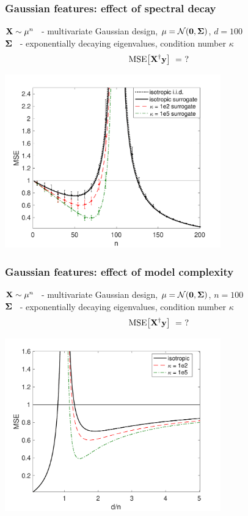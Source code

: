 \documentclass{beamer}
\begin{document}
\begin{frame}
  \frametitle{Gaussian features: effect of spectral decay}
  $\mathbf X\sim\mu^n$ \ - multivariate Gaussian design,
  $\mu=\mathcal{N}(\mathbf 0,\mathbf{\Sigma})$, $d=100$\\
$\mathbf{\Sigma}$ \ - exponentially decaying eigenvalues, condition
number $\kappa$
\pause
\begin{align*}
{\mathrm{MSE}\big[\mathbf X^\dagger\mathbf y\big]}\ =\ ?
  \end{align*}
  \pause \vspace{-3mm}
  \begin{center}
    \includegraphics[width=0.7\textwidth]{../figs/descent-full}
  \end{center}
\end{frame}

\begin{frame}
  \frametitle{Gaussian features: effect of model complexity}
    $\mathbf X\sim\mu^n$ \ - multivariate Gaussian design,
  $\mu=\mathcal{N}(\mathbf 0,\mathbf{\Sigma})$, $n=100$\\
$\mathbf{\Sigma}$ \ - exponentially decaying eigenvalues, condition
number $\kappa$
\begin{align*}
{\mathrm{MSE}\big[\mathbf X^\dagger\mathbf y\big]}\ =\ ?
  \end{align*}\vspace{-3mm}
  \begin{center}
    \includegraphics[width=0.7\textwidth]{../figs/descent-model}
  \end{center}
\end{frame}
\end{document}
